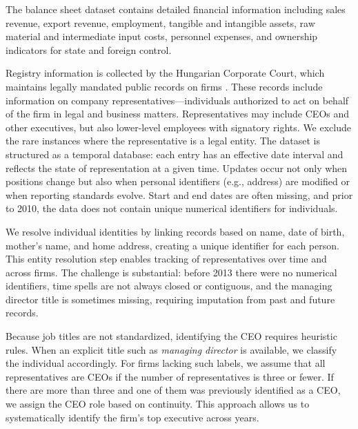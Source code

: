 The balance sheet dataset contains detailed financial information including sales revenue, export revenue, employment, tangible and intangible assets, raw material and intermediate input costs, personnel expenses, and ownership indicators for state and foreign control.

Registry information is collected by the Hungarian Corporate Court, which maintains legally mandated public records on firms \citep{cegtv}. These records include information on company representatives---individuals authorized to act on behalf of the firm in legal and business matters. Representatives may include CEOs and other executives, but also lower-level employees with signatory rights. We exclude the rare instances where the representative is a legal entity. The dataset is structured as a temporal database: each entry has an effective date interval and reflects the state of representation at a given time. Updates occur not only when positions change but also when personal identifiers (e.g., address) are modified or when reporting standards evolve. Start and end dates are often missing, and prior to 2010, the data does not contain unique numerical identifiers for individuals.

We resolve individual identities by linking records based on name, date of birth, mother's name, and home address, creating a unique identifier for each person. This entity resolution step enables tracking of representatives over time and across firms. The challenge is substantial: before 2013 there were no numerical identifiers, time spells are not always closed or contiguous, and the managing director title is sometimes missing, requiring imputation from past and future records. %

Because job titles are not standardized, identifying the CEO requires heuristic rules. When an explicit title such as \emph{managing director} is available, we classify the individual accordingly. For firms lacking such labels, we assume that all representatives are CEOs if the number of representatives is three or fewer. If there are more than three and one of them was previously identified as a CEO, we assign the CEO role based on continuity. This approach allows us to systematically identify the firm's top executive across years.

